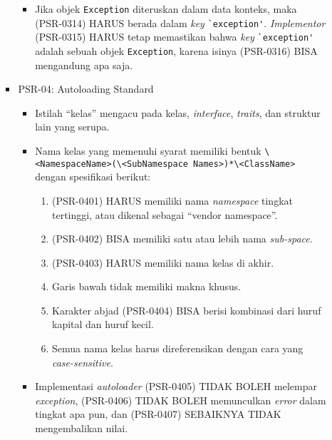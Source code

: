 \documentclass[a4paper,twoside]{article}
\begin{document}
\begin{enumerate}
\begin{enumerate}
\begin{itemize}
\begin{itemize}
					\item Jika objek \verb|Exception| diteruskan dalam data konteks, maka (PSR-0314) HARUS berada dalam \textit{key} \verb|`exception'|. \textit{Implementor} (PSR-0315) HARUS tetap memastikan bahwa \textit{key} \verb|`exception'| adalah sebuah objek \verb|Exception|, karena isinya (PSR-0316) BISA mengandung apa saja.
				\end{itemize}
				
				\item PSR-04: Autoloading Standard
				\begin{itemize}
					\item Istilah ``kelas'' mengacu pada kelas, \textit{interface}, \textit{traits}, dan struktur lain yang serupa.
					\item Nama kelas yang memenuhi syarat memiliki bentuk \texttt{\textbackslash<NamespaceName>(\textbackslash<SubNamespace
						Names>)*\textbackslash<ClassName>} dengan spesifikasi berikut:
					\begin{enumerate}
						\item (PSR-0401) HARUS memiliki nama \textit{namespace} tingkat tertinggi, atau dikenal sebagai ``vendor namespace''.
						\item (PSR-0402) BISA memiliki satu atau lebih nama \textit{sub-space}.
						\item (PSR-0403) HARUS memiliki nama kelas di akhir.
						\item Garis bawah tidak memiliki makna khusus.
						\item Karakter abjad (PSR-0404) BISA berisi kombinasi dari huruf kapital dan huruf kecil.
						\item Semua nama kelas harus direferensikan dengan cara yang \textit{case-sensitive}.
					\end{enumerate}
					\item Implementasi \textit{autoloader} (PSR-0405) TIDAK BOLEH melempar \textit{exception}, (PSR-0406) TIDAK BOLEH memunculkan \textit{error} dalam tingkat apa pun, dan (PSR-0407) SEBAIKNYA TIDAK mengembalikan nilai. 
				\end{itemize}
				

\end{itemize}
\end{enumerate}
\end{enumerate}
\end{document}
